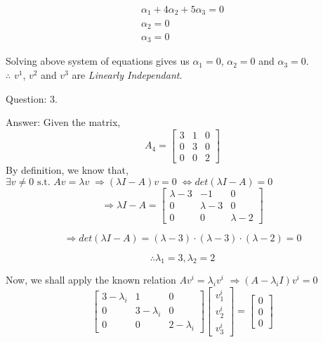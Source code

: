 \documentclass[a4paper]{article}
\begin{document}
\begin{qalist}
			\begin{align}
				{\alpha}_{1} + 4{\alpha}_{2} + 5{\alpha}_{3} = 0 \\
				{\alpha}_{2} = 0 \\
				{\alpha}_{3} = 0
			\end{align}
			
			Solving above system of equations gives us ${\alpha}_{1} = 0$, ${\alpha}_{2} = 0$ and ${\alpha}_{3} = 0$. \\
			$\therefore$ ${v}^{1}$, ${v}^{2}$ and ${v}^{3}$ are \textit{Linearly Independant}.
		
			
		\item[Question: 3.] \setcounter{equation}{0}
		\item[Answer:] Given the matrix, 
			\begin{equation}
				{A}_{4} = \begin{bmatrix} 3 & 1 & 0 \\ 0 & 3 & 0 \\ 0 & 0 & 2\end{bmatrix}
			\end{equation}
			By definition, we know that, $\exists v \neq 0 \text{ s.t. } Av = \lambda v \; \Rightarrow (\lambda I - A) v = 0 \; \Leftrightarrow det(\lambda I - A) = 0$ 
			\begin{equation}
				\Rightarrow \lambda I - A = \begin{bmatrix}\lambda-3 & -1 & 0 \\ 0 & \lambda - 3 & 0 \\ 0 & 0 & \lambda -2\end{bmatrix}
			\end{equation}
			
			\begin{equation}
				\Rightarrow det(\lambda I - A) = (\lambda - 3)\cdot(\lambda - 3)\cdot(\lambda - 2) = 0
			\end{equation}
			
			\begin{equation}
				\therefore {\lambda}_{1} = 3, {\lambda}_{2} = 2
			\end{equation}			
			
			Now, we shall apply the known relation $A{v}^{i} = {\lambda}_{i}{v}^{i}$ $\Rightarrow (A - {\lambda}_{i}I){v}^{i} = 0$ 
			\begin{equation}\label{eq:q3eigVecEqn}
				\begin{bmatrix}3 - {\lambda}_{i} & 1 & 0 \\ 0 & 3 - {\lambda}_{i} & 0 \\ 0 & 0 & 2 - {\lambda}_{i}\end{bmatrix} 
				\begin{bmatrix}{v}^{i}_{1} \\ {v}^{i}_{2} \\ {v}^{i}_{3}\end{bmatrix} = 
				\begin{bmatrix}0 \\ 0 \\ 0\end{bmatrix}
			\end{equation}
			

\end{qalist}
\end{document}
